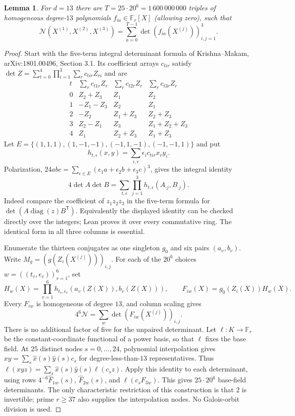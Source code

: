 \documentclass[11pt]{article}
\newtheorem{lemma}{Lemma}
\begin{document}
\begin{lemma}\label{norm:decomposition}
For $d=13$ there are $T=25\cdot20^6=1\,600\,000\,000$ triples of
homogeneous degree-$13$ polynomials $f_{ia}\in\mathbb F_r[X]$ (allowing zero),
such that
\begin{equation}\label{norm:determinant-sum}
 \mathcal N(X^{(1)},X^{(2)},X^{(3)})
 =\sum_{a=0}^{T-1}\det(f_{ia}(X^{(j)}))_{i,j=1}^3.
\end{equation}
\end{lemma}
\begin{proof}
Start with the five-term integral determinant formula of Krishna--Makam,
arXiv:1801.00496, Section 3.1. Its coefficient arrays $c_{tir}$ satisfy
$\det Z=\sum_{t=0}^4\prod_{i=1}^3\sum_r c_{tir}Z_{ri}$ and are
\[
\begin{array}{c|ccc}
t&\sum_r c_{t1r}Z_r&\sum_r c_{t2r}Z_r&\sum_r c_{t3r}Z_r\\\hline
0&Z_2+Z_3&Z_1&Z_2\\
1&-Z_1-Z_3&Z_2&Z_1\\
2&-Z_2&Z_1+Z_3&Z_2+Z_3\\
3&Z_2-Z_1&Z_3&Z_1+Z_2+Z_3\\
4&Z_1&Z_2+Z_3&Z_1+Z_3
\end{array}
\]
Let $E=\{(1,1,1),(1,-1,-1),(-1,1,-1),(-1,-1,1)\}$ and put
\[
 h_{t,\epsilon}(x,y)=\sum_{i,r}\epsilon_i c_{tir}x_ry_i.
\]
Polarization, $24abc=\sum_{\epsilon\in E}(\epsilon_1a+
\epsilon_2b+\epsilon_3c)^3$, gives the integral identity
\[
 4\det A\det B=\sum_{t,\epsilon}\prod_{j=1}^3
                   h_{t,\epsilon}(A_{\cdot j},B_{\cdot j}).
\]
Indeed compare the coefficient of $z_1z_2z_3$ in the five-term formula
for $\det(A\operatorname{diag}(z)B^{\mathsf T})$. Equivalently the displayed
identity can be checked directly over the integers; Lean proves it over
every commutative ring. The identical form in all three columns is essential.

Enumerate the thirteen conjugates as one singleton $g_0$ and six pairs
$(a_v,b_v)$. Write $M_g=(g(Z_i(X^{(j)})))_{i,j}$. For each of the $20^6$
choices $w=((t_v,\epsilon_v))_{v=1}^6$, set
\[
 H_w(X)=\prod_{v=1}^6h_{t_v,\epsilon_v}(a_v(Z(X)),b_v(Z(X))),
 \qquad F_{iw}(X)=g_0(Z_i(X))H_w(X).
\]
Every $F_{iw}$ is homogeneous of degree $13$, and column scaling gives
\[
 4^6\mathcal N=\sum_w\det(F_{iw}(X^{(j)}))_{i,j}.
\]
There is no additional factor of five for the unpaired determinant.
Let $\ell:K\to\mathbb F_r$ be the constant-coordinate functional of a
power basis, so that $\ell$ fixes the base field. At $25$ distinct nodes
$s=0,\ldots,24$, polynomial interpolation gives
$xy=\sum_s\widehat x(s)\widehat y(s)c_s$ for degree-less-than-$13$
representatives. Thus $\ell(xyz)=\sum_s\widehat x(s)\widehat y(s)\ell(c_sz)$.
Apply this identity to each determinant, using rows
$4^{-6}\widehat F_{1w}(s)$, $\widehat F_{2w}(s)$, and $\ell(c_sF_{3w})$.
This gives $25\cdot20^6$ base-field determinants. The only characteristic
restriction of this construction is that $2$ is invertible; prime $r\ge37$
also supplies the interpolation nodes. No Galois-orbit division is used.
\end{proof}
\end{document}
